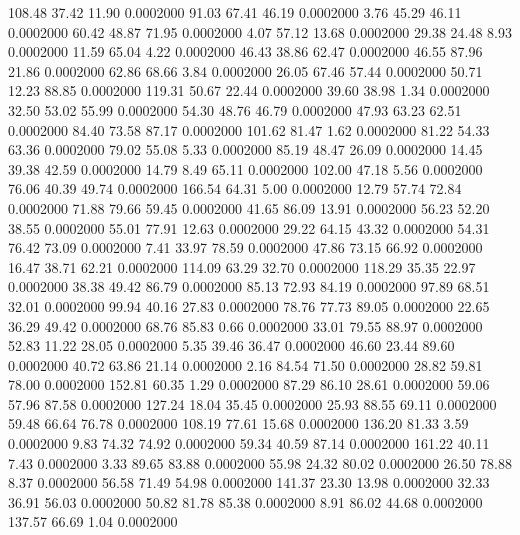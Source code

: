  108.48   37.42   11.90   0.0002000
  91.03   67.41   46.19   0.0002000
   3.76   45.29   46.11   0.0002000
  60.42   48.87   71.95   0.0002000
   4.07   57.12   13.68   0.0002000
  29.38   24.48    8.93   0.0002000
  11.59   65.04    4.22   0.0002000
  46.43   38.86   62.47   0.0002000
  46.55   87.96   21.86   0.0002000
  62.86   68.66    3.84   0.0002000
  26.05   67.46   57.44   0.0002000
  50.71   12.23   88.85   0.0002000
 119.31   50.67   22.44   0.0002000
  39.60   38.98    1.34   0.0002000
  32.50   53.02   55.99   0.0002000
  54.30   48.76   46.79   0.0002000
  47.93   63.23   62.51   0.0002000
  84.40   73.58   87.17   0.0002000
 101.62   81.47    1.62   0.0002000
  81.22   54.33   63.36   0.0002000
  79.02   55.08    5.33   0.0002000
  85.19   48.47   26.09   0.0002000
  14.45   39.38   42.59   0.0002000
  14.79    8.49   65.11   0.0002000
 102.00   47.18    5.56   0.0002000
  76.06   40.39   49.74   0.0002000
 166.54   64.31    5.00   0.0002000
  12.79   57.74   72.84   0.0002000
  71.88   79.66   59.45   0.0002000
  41.65   86.09   13.91   0.0002000
  56.23   52.20   38.55   0.0002000
  55.01   77.91   12.63   0.0002000
  29.22   64.15   43.32   0.0002000
  54.31   76.42   73.09   0.0002000
   7.41   33.97   78.59   0.0002000
  47.86   73.15   66.92   0.0002000
  16.47   38.71   62.21   0.0002000
 114.09   63.29   32.70   0.0002000
 118.29   35.35   22.97   0.0002000
  38.38   49.42   86.79   0.0002000
  85.13   72.93   84.19   0.0002000
  97.89   68.51   32.01   0.0002000
  99.94   40.16   27.83   0.0002000
  78.76   77.73   89.05   0.0002000
  22.65   36.29   49.42   0.0002000
  68.76   85.83    0.66   0.0002000
  33.01   79.55   88.97   0.0002000
  52.83   11.22   28.05   0.0002000
   5.35   39.46   36.47   0.0002000
  46.60   23.44   89.60   0.0002000
  40.72   63.86   21.14   0.0002000
   2.16   84.54   71.50   0.0002000
  28.82   59.81   78.00   0.0002000
 152.81   60.35    1.29   0.0002000
  87.29   86.10   28.61   0.0002000
  59.06   57.96   87.58   0.0002000
 127.24   18.04   35.45   0.0002000
  25.93   88.55   69.11   0.0002000
  59.48   66.64   76.78   0.0002000
 108.19   77.61   15.68   0.0002000
 136.20   81.33    3.59   0.0002000
   9.83   74.32   74.92   0.0002000
  59.34   40.59   87.14   0.0002000
 161.22   40.11    7.43   0.0002000
   3.33   89.65   83.88   0.0002000
  55.98   24.32   80.02   0.0002000
  26.50   78.88    8.37   0.0002000
  56.58   71.49   54.98   0.0002000
 141.37   23.30   13.98   0.0002000
  32.33   36.91   56.03   0.0002000
  50.82   81.78   85.38   0.0002000
   8.91   86.02   44.68   0.0002000
 137.57   66.69    1.04   0.0002000
